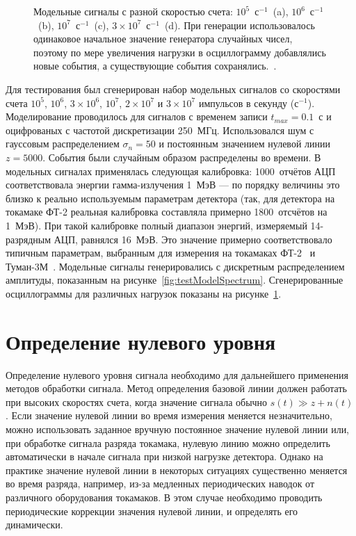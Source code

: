 \begin{figure}[ht!]
  \caption{ Модельные сигналы с разной скоростью счета: $10^5$~с${}^{-1}$~(a), $10^6$~с${}^{-1}$~(b), $10^7$~с${}^{-1}$~(c), $3\times10^7$~с${}^{-1}$~(d). При генерации использовалось одинаковое начальное значение генератора случайных чисел, поэтому по мере увеличения нагрузки в осциллограмму добавлялись новые события, а существующие события сохранялись.~\cite{Khilkevitch2020}.}
  \label{fig:testModelSignal}
\end{figure}

Для тестирования был сгенерирован набор модельных сигналов со скоростями счета $10^5$, $10^6$, $3\times10^6$, $10^7$, $2\times10^7$ и $3\times10^7$ импульсов в секунду (с${}^{-1}$). Моделирование проводилось для сигналов с временем записи $t_{max} = 0.1$~с и оцифрованых с частотой дискретизации 250~МГц. Использовался шум с гауссовым распределением $\sigma_n = 50$ и постоянным значением нулевой линии $z = 5000$. События были случайным образом распределены во времени. В модельных сигналах применялась следующая калибровка: 1000~отчётов АЦП соответствовала энергии гамма-излучения 1~МэВ --- по порядку величины это близко к реально используемым параметрам детектора (так, для детектора на токамаке ФТ-2 реальная калибровка составляла примерно 1800~отсчётов на 1~МэВ). При такой калибровке полный диапазон энергий, измеряемый 14-разрядным АЦП, равнялся 16~МэВ. Это значение примерно соответствовало типичным параметрам, выбранным для измерения на токамаках ФТ-2~\cite{Shevelev2016,Shevelev2017} и Туман-3М~\cite{Shevelev2018}. Модельные сигналы генерировались с дискретным распределением амплитуды, показанным на рисунке~\ref{fig:testModelSpectrum}. Сгенерированные осциллограммы для различных нагрузок показаны на рисунке~\ref{fig:testModelSignal}.~\cite{Khilkevitch2020}


\section{Определение нулевого уровня}

Определение нулевого уровня сигнала необходимо для дальнейшего применения методов обработки сигнала. Метод определения базовой линии должен работать при высоких скоростях счета, когда значение сигнала обычно $s(t) \gg z + n(t)$. Если значение нулевой линии во время измерения меняется незначительно, можно использовать заданное вручную постоянное значение нулевой линии или, при обработке сигнала разряда токамака, нулевую линию можно определить автоматически в начале сигнала при низкой нагрузке детектора. Однако на практике значение нулевой линии в некоторых ситуациях существенно меняется во время разряда, например, из-за медленных периодических наводок от различного оборудования токамаков. В этом случае необходимо проводить периодические коррекции значения нулевой линии, и определять его динамически.

